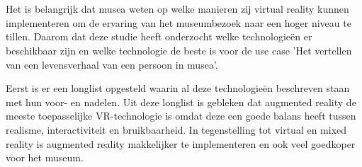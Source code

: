
%
%

%



\chapter*{}
Het is belangrijk dat musea weten op welke manieren zij virtual reality kunnen implementeren om de ervaring van het museumbezoek naar een hoger niveau te tillen.
Daarom dat deze studie heeft onderzocht welke technologieën er beschikbaar zijn en welke technologie de beste is voor de use case 'Het vertellen van een levensverhaal van een persoon in musea'.

Eerst is er een longlist opgesteld waarin al deze technologieën beschreven staan met hun voor- en nadelen.
Uit deze longlist is gebleken dat augmented reality de meeste toepasselijke VR-technologie is omdat deze een goede balans heeft tussen realisme, interactiviteit en bruikbaarheid.
In tegenstelling tot virtual en mixed reality is augmented reality makkelijker te implementeren en ook veel goedkoper voor het museum.

